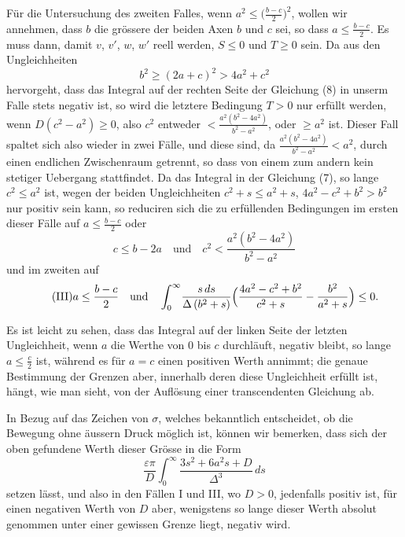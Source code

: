 \documentclass[12pt,a4paper]{article}
\begin{document}
Für die Untersuchung des zweiten Falles, wenn $a^2 \leq \bigl(\frac{b-c}{2}\bigr)^2$, wollen wir annehmen, dass $b$ die grössere der beiden Axen $b$ und $c$ sei, so dass $a \leq \frac{b-c}{2}$. Es muss dann, damit $v$, $v'$, $w$, $w'$ reell werden, $S \leq 0$ und $T \geq 0$ sein. Da aus den Ungleichheiten
\[ b^2 \geq (2a+c)^2 > 4a^2 + c^2 \]
hervorgeht, dass das Integral auf der rechten Seite der Gleichung (8) in unserm Falle stets negativ ist, so wird die letztere Bedingung $T > 0$ nur erfüllt werden, wenn $D(c^2 - a^2) \geq 0$, also $c^2$ entweder $< \frac{a^2(b^2 - 4a^2)}{b^2 - a^2}$, oder $\geq a^2$ ist. Dieser Fall spaltet sich also wieder in zwei Fälle, und diese sind, da $\frac{a^2(b^2-4a^2)}{b^2-a^2} < a^2$, durch einen endlichen Zwischenraum getrennt, so dass von einem zum andern kein stetiger Uebergang stattfindet. Da das Integral in der Gleichung (7), so lange $c^2 \leq a^2$ ist, wegen der beiden Ungleichheiten $c^2 + s \leq a^2 + s$, $4a^2 - c^2 + b^2 > b^2$ nur positiv sein kann, so reduciren sich die zu erfüllenden Bedingungen im ersten dieser Fälle auf $a \leq \frac{b-c}{2}$ oder
\begin{equation}
\tag{II} c \leq b - 2a \quad\text{und}\quad c^2 < \frac{a^2(b^2 - 4a^2)}{b^2 - a^2} \end{equation}
und im zweiten auf
\begin{equation}
\tag{III} a \leq \frac{b-c}{2} \quad\text{und}\quad \int_0^{\infty}\!\frac{s\,ds}{\Delta\,(b^2+s)}\Bigl(\frac{4a^2 - c^2 + b^2}{c^2+s} - \frac{b^2}{a^2+s}\Bigr) \leq 0. \end{equation}

Es ist leicht zu sehen, dass das Integral auf der linken Seite der letzten Ungleichheit, wenn $a$ die Werthe von $0$ bis $c$ durchläuft, negativ bleibt, so lange $a \leq \frac{c}{2}$ ist, während es für $a = c$ einen positiven Werth annimmt; die genaue Bestimmung der Grenzen aber, innerhalb deren diese Ungleichheit erfüllt ist, hängt, wie man sieht, von der Auflösung einer transcendenten Gleichung ab.

In Bezug auf das Zeichen von $\sigma$, welches bekanntlich entscheidet, ob die Bewegung ohne äussern Druck möglich ist, können wir bemerken, dass sich der oben gefundene Werth dieser Grösse in die Form
\[ \frac{\varepsilon\pi}{D}\int_0^{\infty}\!\frac{3s^2 + 6a^2s + D}{\Delta^3}\,ds \]
setzen lässt, und also in den Fällen I und III, wo $D > 0$, jedenfalls positiv ist, für einen negativen Werth von $D$ aber, wenigstens so lange dieser Werth absolut genommen unter einer gewissen Grenze liegt, negativ wird.
\end{document}

